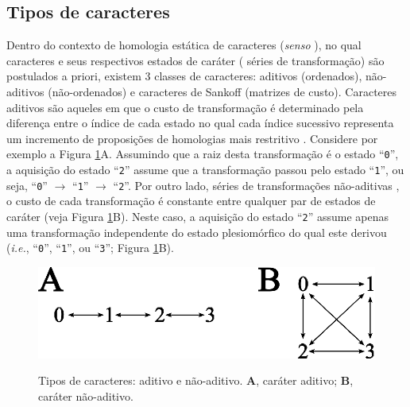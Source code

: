 \newpage
\pagestyle{fancy} %
\begin{refsection}
\renewcommand*{\finalnamedelim}{\addspace\&\space}%

\section{Tipos de caracteres}\label{tut6:chartypes}

Dentro do contexto de homologia estática de caracteres (\textit{senso} \textcite{Wheeler_2001}), no qual caracteres e seus respectivos estados de caráter (\ie{~} séries de transformação) são postulados a priori, existem 3 classes de caracteres: aditivos (ordenados), não-aditivos (não-ordenados) e caracteres de Sankoff (matrizes de custo). Caracteres aditivos \parencite{Farris_1970} são aqueles em que o custo de transformação é determinado pela diferença entre o índice de cada estado no qual cada índice sucessivo representa um incremento de proposições de homologias mais restritivo \parencite{wheeler_2012}. Considere por exemplo a Figura \ref{tut6:fig:chartypes}A. Assumindo que a raiz desta transformação é o estado ``\texttt{0}'', a aquisição do estado ``\texttt{2}'' assume que a transformação passou pelo estado ``\texttt{1}'', ou seja, ``\texttt{0}'' $\rightarrow$ ``\texttt{1}'' $\rightarrow$ ``\texttt{2}''. Por outro lado, séries de transformações não-aditivas \parencite[][]{Fitch_1971}, o custo de cada transformação é constante entre qualquer par de estados de caráter (veja  Figura \ref{tut6:fig:chartypes}B). Neste caso, a aquisição do estado ``\texttt{2}'' assume apenas uma transformação independente do estado plesiomórfico do qual este derivou (\textit{i.e.}, ``\texttt{0}'', ``\texttt{1}'', ou ``\texttt{3}''; Figura \ref{tut6:fig:chartypes}B).\\

  \begin{figure}[H]
      {\includegraphics[scale=1.00]{figures/tut6/character_types.eps}}
	{\caption[Tipos de caracteres: aditivo e não-aditivo]{Tipos de caracteres: aditivo e não-aditivo. \textbf{A}, caráter aditivo; \textbf{B}, caráter não-aditivo.}\label{tut6:fig:chartypes}}
  \end{figure}


\end{refsection}
